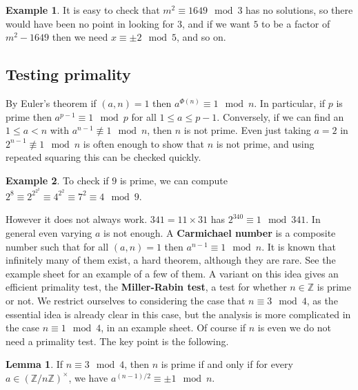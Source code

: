 \documentclass{article}
\newcommand{\Z}{\mathbb{Z}}
\newcommand{\rb}[1]{\left( #1 \right)}
\newcommand{\unit}[1]{\rb{\Z / #1\Z}^\times}
\theoremstyle{definition}\newtheorem{definition}{Definition}
\theoremstyle{definition}\newtheorem*{remark}{Remark}
\theoremstyle{definition}\newtheorem*{example}{Example}
\theoremstyle{definition}\newtheorem*{note}{Note}
\newtheorem{lemma}[definition]{Lemma}
\begin{document}
\begin{example}
It is easy to check that $ m^2 \equiv 1649 \mod 3 $ has no solutions, so there would have been no point in looking for $ 3 $, and if we want $ 5 $ to be a factor of $ m^2 - 1649 $ then we need $ x \equiv \pm 2 \mod 5 $, and so on.
\end{example}


\subsection{Testing primality}

By Euler's theorem if $ \rb{a, n} = 1 $ then $ a^{\Phi\rb{n}} \equiv 1 \mod n $. In particular, if $ p $ is prime then $ a^{p - 1} \equiv 1 \mod p $ for all $ 1 \le a \le p - 1 $. Conversely, if we can find an $ 1 \le a < n $ with $ a^{n - 1} \not\equiv 1 \mod n $, then $ n $ is not prime. Even just taking $ a = 2 $ in $ 2^{n - 1} \not\equiv 1 \mod n $ is often enough to show that $ n $ is not prime, and using repeated squaring this can be checked quickly.

\begin{example}
To check if $ 9 $ is prime, we can compute $ 2^8 \equiv 2^{2^{2^2}} \equiv 4^{2^2} \equiv 7^2 \equiv 4 \mod 9 $.
\end{example}

However it does not always work. $ 341 = 11 \times 31 $ has $ 2^{340} \equiv 1 \mod 341 $. In general even varying $ a $ is not enough. A \textbf{Carmichael number} is a composite number such that for all $ \rb{a, n} = 1 $ then $ a^{n - 1} \equiv 1 \mod n $. It is known that infinitely many of them exist, a hard theorem, although they are rare. See the example sheet for an example of a few of them. A variant on this idea gives an efficient primality test, the \textbf{Miller-Rabin test}, a test for whether $ n \in \Z $ is prime or not. We restrict ourselves to considering the case that $ n \equiv 3 \mod 4 $, as the essential idea is already clear in this case, but the analysis is more complicated in the case $ n \equiv 1 \mod 4 $, in an example sheet. Of course if $ n $ is even we do not need a primality test. The key point is the following.

\begin{lemma}
\label{lem:30}
If $ n \equiv 3 \mod 4 $, then $ n $ is prime if and only if for every $ a \in \unit{n} $, we have $ a^{\rb{n - 1} / 2} \equiv \pm 1 \mod n $.
\end{lemma}
\end{document}
